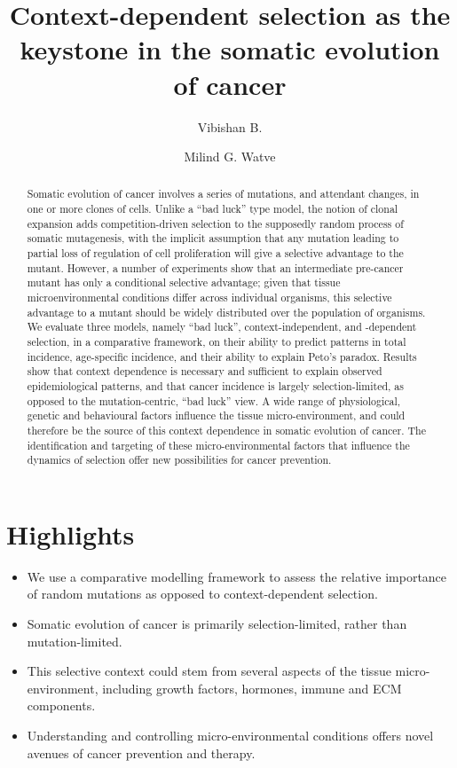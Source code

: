 \documentclass[12pt,onecolumn,twoside]{article}
\author[1]{Vibishan B.}
\author[1,*]{Milind G. Watve}
\affil[1]{Department of Biology, Indian Institute of Science Education and Research (IISER), Pune}
\affil[*]{Corresponding author: milind@iiserpune.ac.in}
\title{Context-dependent selection as the keystone in the somatic evolution of cancer}
\begin{document}
\maketitle
\begin{abstract}
	Somatic evolution of cancer involves a series of mutations, and attendant changes, in one or more clones of cells. Unlike a ``bad luck'' type model, the notion of clonal expansion adds competition-driven selection to the supposedly random process of somatic mutagenesis, with the implicit assumption that any mutation leading to partial loss of regulation of cell proliferation will give a selective advantage to the mutant. However, a number of experiments show that an intermediate pre-cancer mutant has only a conditional selective advantage; given that tissue microenvironmental conditions differ across individual organisms, this selective advantage to a mutant should be widely distributed over the population of organisms. We evaluate three models, namely ``bad luck'', context-independent, and -dependent selection, in a comparative framework, on their ability to predict patterns in total incidence, age-specific incidence, and their ability to explain Peto’s paradox. Results show that context dependence is necessary and sufficient to explain observed epidemiological patterns, and that cancer incidence is largely selection-limited, as opposed to the mutation-centric, ``bad luck'' view. A wide range of physiological, genetic and behavioural factors influence the tissue micro-environment, and could therefore be the source of this context dependence in somatic evolution of cancer. The identification and targeting of these micro-environmental factors that influence the dynamics of selection offer new possibilities for cancer prevention.
\end{abstract}

\section*{Highlights}
	\begin{itemize}
	\item We use a comparative modelling framework to assess the relative importance of random mutations as opposed to context-dependent selection.
	\item Somatic evolution of cancer is primarily selection-limited, rather than mutation-limited.
	\item This selective context could stem from several aspects of the tissue micro-environment, including growth factors, hormones, immune and ECM components.
	\item Understanding and controlling micro-environmental conditions offers novel avenues of cancer prevention and therapy.
	\end{itemize}
\end{document}
